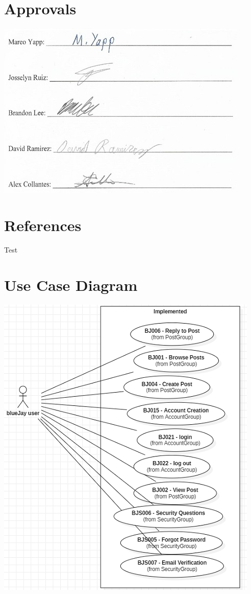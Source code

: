\documentclass{report}
\begin{document}
\chapter{Approvals} 
\includegraphics{Signatures}
\newpage

\chapter{References}
Test
\appendix
\chapter{Use Case Diagram}
\label{app:use_case_diagram}
\includegraphics{UseCaseDiagram}
\end{document}
